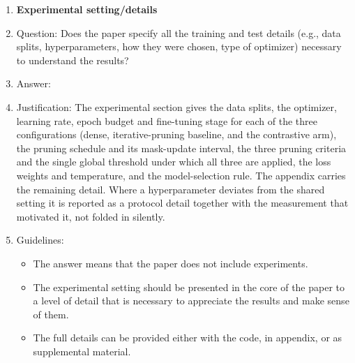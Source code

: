 \begin{enumerate}
\item {\bf Experimental setting/details}
    \item[] Question: Does the paper specify all the training and test details (e.g., data splits, hyperparameters, how they were chosen, type of optimizer) necessary to understand the results?
    \item[] Answer: \answerYes{}
    \item[] Justification: The experimental section gives the data splits, the optimizer, learning rate, epoch budget and fine-tuning stage for each of the three configurations (dense, iterative-pruning baseline, and the contrastive arm), the pruning schedule and its mask-update interval, the three pruning criteria and the single global threshold under which all three are applied, the loss weights and temperature, and the model-selection rule. The appendix carries the remaining detail. Where a hyperparameter deviates from the shared setting it is reported as a protocol detail together with the measurement that motivated it, not folded in silently.
    \item[] Guidelines:
    \begin{itemize}
        \item The answer \answerNA{} means that the paper does not include experiments.
        \item The experimental setting should be presented in the core of the paper to a level of detail that is necessary to appreciate the results and make sense of them.
        \item The full details can be provided either with the code, in appendix, or as supplemental material.
    \end{itemize}


\end{enumerate}
